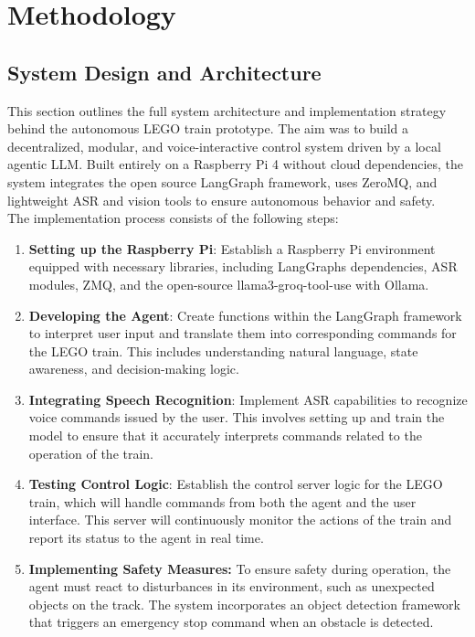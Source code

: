 \chapter{Methodology}
\label{sec:methodology}

\section{System Design and Architecture}
This section outlines the full system architecture and implementation strategy behind the autonomous LEGO train prototype. The aim was to build a decentralized, modular, and voice-interactive control system driven by a local agentic LLM. Built entirely on a Raspberry Pi 4 without cloud dependencies, the system integrates the open source LangGraph framework, uses ZeroMQ, and lightweight ASR and vision tools to ensure autonomous behavior and safety. \\

The implementation process consists of the following steps:

\begin{enumerate}
    \item \textbf{Setting up the Raspberry Pi}: Establish a Raspberry Pi environment equipped with necessary libraries, including LangGraphs dependencies, ASR modules, ZMQ, and the open-source llama3-groq-tool-use with Ollama.
    \item \textbf{Developing the Agent}: Create functions within the LangGraph framework to interpret user input and translate them into corresponding commands for the LEGO train. This includes understanding natural language, state awareness, and decision-making logic.
    \item \textbf{Integrating Speech Recognition}: Implement ASR capabilities to recognize voice commands issued by the user. This involves setting up and train the model to ensure that it accurately interprets commands related to the operation of the train.
    \item  \textbf{Testing Control Logic}: Establish the control server logic for the LEGO train, which will handle commands from both the agent and the user interface. This server will continuously monitor the actions of the train and report its status to the agent in real time.
    \item  \textbf{Implementing Safety Measures:} To ensure safety during operation, the agent must react to disturbances in its environment, such as unexpected objects on the track. The system incorporates an object detection framework that triggers an emergency stop command when an obstacle is detected.
\end{enumerate}

